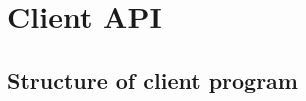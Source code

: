 %
%
%
%
%
%
%
%
%

\section{Client API}

\subsection{Structure of client program}
\label{sec:client_prg}

